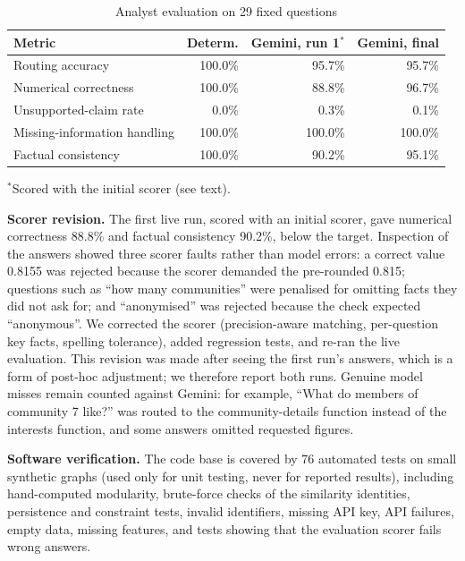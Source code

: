 \documentclass[conference]{IEEEtran}
\begin{document}
\begin{table}[t]
\caption{Analyst evaluation on 29 fixed questions}
\label{tab:eval}
\centering
\begin{tabular}{lrrr}
\toprule
Metric & Determ. & Gemini, run 1$^{*}$ & Gemini, final \\
\midrule
Routing accuracy & 100.0\% & 95.7\% & 95.7\% \\
Numerical correctness & 100.0\% & 88.8\% & 96.7\% \\
Unsupported-claim rate & 0.0\% & 0.3\% & 0.1\% \\
Missing-information handling & 100.0\% & 100.0\% & 100.0\% \\
Factual consistency & 100.0\% & 90.2\% & 95.1\% \\
\bottomrule
\end{tabular}

\vspace{2pt}
\footnotesize{$^{*}$Scored with the initial scorer (see text).}
\end{table}

\textbf{Scorer revision.} The first live run, scored with an initial scorer, gave numerical correctness 88.8\% and factual consistency 90.2\%, below the target. Inspection of the answers showed three scorer faults rather than model errors: a correct value 0.8155 was rejected because the scorer demanded the pre-rounded 0.815; questions such as ``how many communities'' were penalised for omitting facts they did not ask for; and ``anonymised'' was rejected because the check expected ``anonymous''. We corrected the scorer (precision-aware matching, per-question key facts, spelling tolerance), added regression tests, and re-ran the live evaluation. This revision was made after seeing the first run's answers, which is a form of post-hoc adjustment; we therefore report both runs. Genuine model misses remain counted against Gemini: for example, ``What do members of community 7 like?'' was routed to the community-details function instead of the interests function, and some answers omitted requested figures.

\textbf{Software verification.} The code base is covered by 76 automated tests on small synthetic graphs (used only for unit testing, never for reported results), including hand-computed modularity, brute-force checks of the similarity identities, persistence and constraint tests, invalid identifiers, missing API key, API failures, empty data, missing features, and tests showing that the evaluation scorer fails wrong answers.
\end{document}
